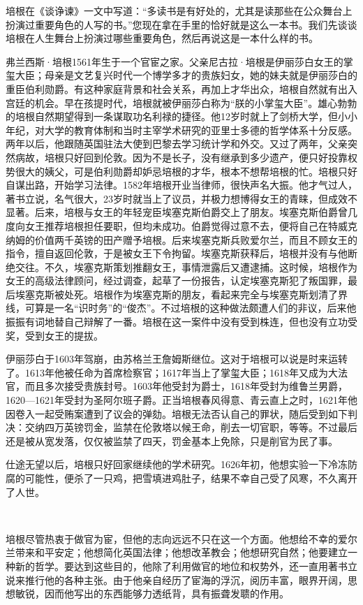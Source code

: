 \par 培根在《谈诤谏》一文中写道：“多读书是有好处的，尤其是读那些在公众舞台上扮演过重要角色的人写的书。”您现在拿在手里的恰好就是这么一本书。我们先谈谈培根在人生舞台上扮演过哪些重要角色，然后再说这是一本什么样的书。
\par 弗兰西斯·培根1561年生于一个官宦之家。父亲尼古拉·培根是伊丽莎白女王的掌玺大臣；母亲是文艺复兴时代一个博学多才的贵族妇女，她的妹夫就是伊丽莎白的重臣伯利勋爵。有这种家庭背景和社会关系，再加上才华出众，培根自然就有出入宫廷的机会。早在孩提时代，培根就被伊丽莎白称为“朕的小掌玺大臣”。雄心勃勃的培根自然期望得到一条谋取功名利禄的捷径。他12岁时就上了剑桥大学，但小小年纪，对大学的教育体制和当时主宰学术研究的亚里士多德的哲学体系十分反感。两年以后，他跟随英国驻法大使到巴黎去学习统计学和外交。又过了两年，父亲突然病故，培根只好回到伦敦。因为不是长子，没有继承到多少遗产，便只好投靠权势很大的姨父，可是伯利勋爵却妒忌培根的才华，根本不想帮培根的忙。培根只好自谋出路，开始学习法律。1582年培根开业当律师，很快声名大振。他才气过人，著书立说，名气很大，23岁时就当上了议员，并极力想博得女王的青睐，但成效不显著。后来，培根与女王的年轻宠臣埃塞克斯伯爵交上了朋友。埃塞克斯伯爵曾几度向女王推荐培根担任要职，但均未成功。伯爵觉得过意不去，便将自己在特威克纳姆的价值两千英镑的田产赠予培根。后来埃塞克斯兵败爱尔兰，而且不顾女王的指令，擅自返回伦敦，于是被女王下令拘留。埃塞克斯获释后，培根并没有与他断绝交往。不久，埃塞克斯策划推翻女王，事情泄露后又遭逮捕。这时候，培根作为女王的高级法律顾问，经过调查，起草了一份报告，认定埃塞克斯犯了叛国罪，最后埃塞克斯被处死。培根作为埃塞克斯的朋友，看起来完全与埃塞克斯划清了界线，可算是一名“识时务”的“俊杰”。不过培根的这种做法颇遭人们的非议，后来他振振有词地替自己辩解了一番。培根在这一案件中没有受到株连，但也没有立功受奖，受到女王的提拔。
\par 伊丽莎白于1603年驾崩，由苏格兰王詹姆斯继位。这对于培根可以说是时来运转了。1613年他被任命为首席检察官；1617年当上了掌玺大臣；1618年又成为大法官，而且多次接受贵族封号。1603年他受封为爵士，1618年受封为维鲁兰男爵，1620—1621年受封为圣阿尔班子爵。正当培根春风得意、青云直上之时，1621年他因卷入一起受贿案遭到了议会的弹劾。培根无法否认自己的罪状，随后受到如下判决：交纳四万英镑罚金，监禁在伦敦塔以候王命，削去一切官职，等等。不过最后还是被从宽发落，仅仅被监禁了四天，罚金基本上免除，只是削官为民了事。
\par 仕途无望以后，培根只好回家继续他的学术研究。1626年初，他想实验一下冷冻防腐的可能性，便杀了一只鸡，把雪填进鸡肚子，结果不幸自己受了风寒，不久离开了人世。
\par  
\par 培根尽管热衷于做官为宦，但他的志向远远不只在这一个方面。他想给不幸的爱尔兰带来和平安定；他想简化英国法律；他想改革教会；他想研究自然；他要建立一种新的哲学。要达到这些目的，他除了利用做官的地位和权势外，还一直用著书立说来推行他的各种主张。由于他亲自经历了宦海的浮沉，阅历丰富，眼界开阔，思想敏锐，因而他写出的东西能够力透纸背，具有振聋发聩的作用。
